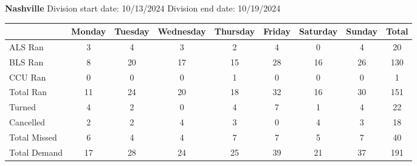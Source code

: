 \documentclass{article}
\begin{document}
\textbf{ Nashville }
Division start date: 10/13/2024
Division end date: 10/19/2024

\begin{longtable}{l|cccccccc}
\toprule
 & Monday & Tuesday & Wednesday & Thursday & Friday & Saturday & Sunday & Total \\
\midrule

ALS Ran & 
3 & 
4 & 
3 & 
2 & 
4 & 
0 & 
4 & 
20 \\

BLS Ran & 
8 & 
20 & 
17 & 
15 & 
28 & 
16 & 
26 & 
130 \\

CCU Ran & 
0 & 
0 & 
0 & 
1 & 
0 & 
0 & 
0 & 
1 \\

Total Ran & 
11 & 
24 & 
20 & 
18 & 
32 & 
16 & 
30 & 
151 \\

Turned & 
4 & 
2 & 
0 & 
4 & 
7 & 
1 & 
4 & 
22 \\

Cancelled & 
2 & 
2 & 
4 & 
3 & 
0 & 
4 & 
3 & 
18 \\

Total Missed & 
6 & 
4 & 
4 & 
7 & 
7 & 
5 & 
7 & 
40 \\

Total Demand & 
17 & 
28 & 
24 & 
25 & 
39 & 
21 & 
37 & 
191 \\

\bottomrule
\end{longtable}
\end{document}

